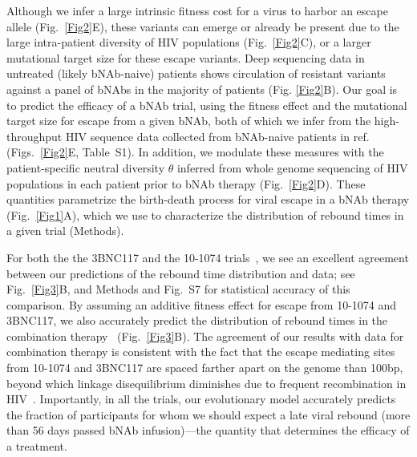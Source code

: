 \documentclass[aps,prx,noshowpacs,twocolumn,nofootinbib]{revtex4-2}
\begin{document}
Although we infer a large intrinsic fitness cost for a virus to harbor an escape allele (Fig.~\ref{Fig2}E), these variants can emerge or already be present due to the large intra-patient diversity of HIV populations (Fig.~\ref{Fig2}C), or a larger mutational target size for these escape variants. Deep sequencing data in untreated (likely bNAb-naive) patients shows circulation of resistant variants against a panel of bNAbs in the majority of patients (Fig. \ref{Fig2}B). Our goal is to predict the efficacy of a bNAb trial, using the fitness effect and  the mutational target size for escape from a given bNAb, both of which we infer from the high-throughput HIV sequence data collected from bNAb-naive patients in ref.~\cite{Zanini:2015gg} (Figs.~\ref{Fig2}E, Table~S1). In addition, we modulate these measures with the patient-specific neutral diversity $\theta$ inferred from whole genome sequencing of HIV populations in each patient prior to bNAb therapy (Fig.~\ref{Fig2}D). These quantities parametrize the birth-death process for viral escape in a bNAb therapy (Fig.~\ref{Fig1}A), which we use to characterize the  distribution of rebound times in a given trial (Methods).


For both the  the 3BNC117 and the 10-1074 trials~\cite{Caskey:2015hm,Caskey:2017el}, we see an excellent agreement between our predictions of the rebound time distribution and data; see Fig.~\ref{Fig3}B, and Methods and Fig.~S7 for statistical accuracy of this comparison. By assuming an additive fitness effect for escape from 10-1074 and  3BNC117, we also accurately predict the distribution of rebound times  in the combination therapy~\cite{bar-onSafetyAntiviralActivity2018} (Fig.~\ref{Fig3}B). The agreement of our results with  data for combination therapy is consistent with the fact that the escape mediating sites from 10-1074 and 3BNC117 are spaced farther apart on the genome than 100bp, beyond which linkage disequilibrium diminishes due to  
frequent recombination in HIV~\cite{Zanini:2015gg}. Importantly, in all the trials, our evolutionary model accurately predicts the fraction of participants for whom  we should expect a late viral rebound (more than 56 days passed bNAb infusion)---the quantity that determines the efficacy of a treatment. 
\end{document}
